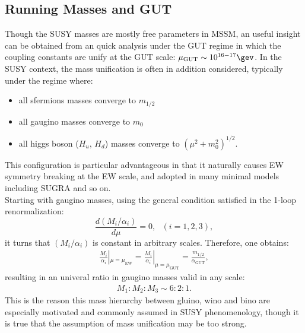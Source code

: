 \subsection{Running Masses and GUT} \label{sec::Introduction::SUSYMassGUT}
Though the SUSY masses are mostly free parameters in MSSM, 
an useful insight can be obtained from an quick analysis under the GUT regime in which the coupling constants are unify at the GUT scale: $\mu_{\mathrm{GUT}}\sim 10^{16-17}\gev$. 
%
In the SUSY context, the mass unification is often in addition considered, typically under the regime where:
\begin{itemize}
\item all sfermions masses converge to $m_{1/2}$
\item all gaugino masses converge to $m_0$
\item all higgs boson ($H_u$, $H_d$) masses converge to $(\mu^2+m_0^2)^{1/2}$.
\end{itemize}
This configuration is particular advantageous in that it naturally causes EW symmetry breaking at the EW scale, 
and adopted in many minimal models including SUGRA and so on. \\
%
Starting with gaugino masses, using the general condition satisfied in the 1-loop renormalization:
$$
\frac{d(M_i/\alpha_i)}{d\mu} = 0, \,\,\,\, (i=1,2,3),
$$
it turns that $(M_i/\alpha_i)$ is constant in arbitrary scales. Therefore, one obtains:
\begin{align}
\frac{M_i}{\alpha_i}|_{\mu=\mu_{\mathrm{EW}}}  = \frac{M_i}{\alpha_i}|_{\mu=\mu_{\mathrm{GUT}}} = \frac{m_{1/2}}{\alpha_{\mathrm{GUT}}},
\end{align}
resulting in an univeral ratio in gaugino masses valid in any scale:
\begin{align}
M_1 : M_2 : M_3 \sim 6:2:1. \label{eq::gauginoMass_621}
\end{align}
This is the reason this mass hierarchy between gluino, wino and bino are especially motivated and commonly assumed in SUSY phenomenology, though it is true that the assumption of mass unification may be too strong. \\


